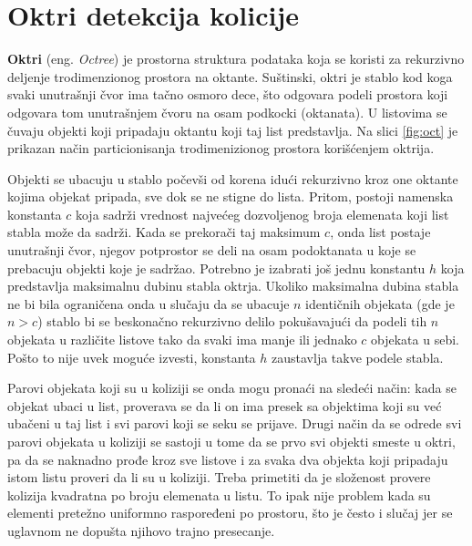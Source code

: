 \documentclass[12pt,oneside]{memoir}
\begin{document}
\section{Oktri detekcija kolicije}
\label{subsec:octree}

\textbf{Oktri} (eng. {\em Octree}) je prostorna struktura podataka koja se koristi za rekurzivno deljenje trodimenzionog prostora na oktante.
Suštinski, oktri je stablo kod koga svaki unutrašnji čvor ima tačno osmoro dece,
što odgovara podeli prostora koji odgovara tom unutrašnjem čvoru na osam podkocki (oktanata).
U listovima se čuvaju objekti koji pripadaju oktantu koji taj list predstavlja.
Na slici \ref{fig:oct} je prikazan način particionisanja trodimenizionog prostora korišćenjem oktrija.

Objekti se ubacuju u stablo počevši od korena idući rekurzivno kroz one oktante kojima objekat pripada,
sve dok se ne stigne do lista.
Pritom, postoji namenska konstanta $c$ koja sadrži vrednost najvećeg dozvoljenog broja elemenata koji list stabla može da sadrži.
Kada se prekorači taj maksimum $c$, onda list postaje unutrašnji čvor, njegov potprostor se deli 
na osam podoktanata u koje se prebacuju objekti koje je sadržao.
Potrebno je izabrati još jednu konstantu $h$ koja predstavlja maksimalnu dubinu stabla oktrja.
Ukoliko maksimalna dubina stabla ne bi bila ograničena onda u slučaju da se ubacuje $n$ identičnih objekata (gde je $n > c$)
stablo bi se beskonačno rekurzivno delilo pokušavajući da podeli tih $n$ objekata u različite listove 
tako da svaki ima manje ili jednako $c$ objekata u sebi. 
Pošto to nije uvek moguće izvesti, konstanta $h$ zaustavlja takve podele stabla.

Parovi objekata koji su u koliziji se onda mogu pronaći na sledeći način:
kada se objekat ubaci u list, proverava se da li on ima presek sa objektima koji su već
ubačeni u taj list i svi parovi koji se seku se prijave.
Drugi način da se odrede svi parovi objekata u koliziji se sastoji u tome da se prvo svi objekti smeste u oktri, 
pa da se naknadno prođe kroz sve listove i za svaka dva objekta koji pripadaju istom listu proveri da li su u koliziji.
Treba primetiti da je složenost provere kolizija kvadratna po broju elemenata u listu.
To ipak nije problem kada su elementi pretežno uniformno raspoređeni po prostoru, što je često 
i slučaj jer se uglavnom ne dopušta njihovo trajno presecanje. 
\end{document}
